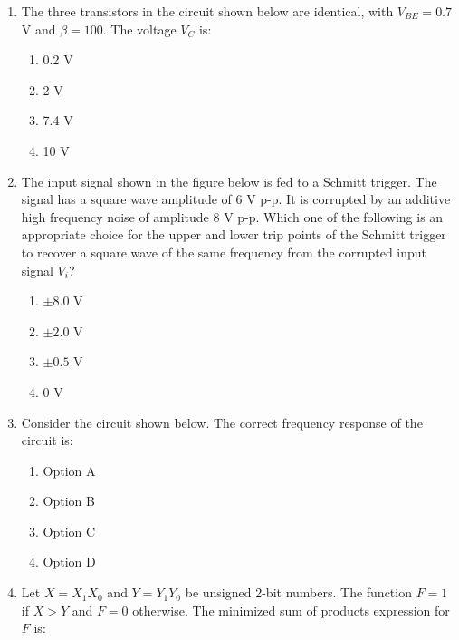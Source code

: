 \documentclass[journal]{IEEEtran}
\begin{document}
\begin{enumerate}
\item The three transistors in the circuit shown below are identical, with $V_{BE} = 0.7$ V and $\beta = 100$. The voltage $V_C$ is:

\begin{multicols}{2}
\begin{enumerate}
    \item 0.2 V
    \item 2 V
    \item 7.4 V
    \item 10 V
\end{enumerate}
\end{multicols}

\item The input signal shown in the figure below is fed to a Schmitt trigger. The signal has a square wave amplitude of 6 V p-p. It is corrupted by an additive high frequency noise of amplitude 8 V p-p. Which one of the following is an appropriate choice for the upper and lower trip points of the Schmitt trigger to recover a square wave of the same frequency from the corrupted input signal $V_i$?

\begin{multicols}{2}
\begin{enumerate}
    \item $\pm 8.0$ V
    \item $\pm 2.0$ V
    \item $\pm 0.5$ V
    \item 0 V
\end{enumerate}
\end{multicols}

\item Consider the circuit shown below. The correct frequency response of the circuit is:

\begin{multicols}{2}
\begin{enumerate}
    \item Option A
    \item Option B
    \item Option C
    \item Option D
\end{enumerate}
\end{multicols}

\item Let $X = X_1X_0$ and $Y = Y_1Y_0$ be unsigned 2-bit numbers. The function $F = 1$ if $X > Y$ and $F = 0$ otherwise. The minimized sum of products expression for $F$ is:


\end{enumerate}
\end{document}
